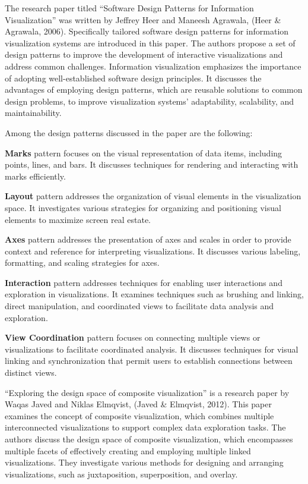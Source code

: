 \documentclass[print]{nuthesis}
\begin{document}
The research paper titled ``Software Design Patterns for Information Visualization'' was written by Jeffrey Heer and Maneesh Agrawala, (Heer \& Agrawala, 2006).
Specifically tailored software design patterns for information visualization systems are introduced in this paper.
The authors propose a set of design patterns to improve the development of interactive visualizations and address common challenges.
Information visualization emphasizes the importance of adopting well-established software design principles.
It discusses the advantages of employing design patterns, which are reusable solutions to common design problems, to improve visualization systems' adaptability, scalability, and maintainability.

Among the design patterns discussed in the paper are the following:

\textbf{Marks} pattern focuses on the visual representation of data items, including points, lines, and bars.
It discusses techniques for rendering and interacting with marks efficiently.

\textbf{Layout} pattern addresses the organization of visual elements in the visualization space.
It investigates various strategies for organizing and positioning visual elements to maximize screen real estate.

\textbf{Axes} pattern addresses the presentation of axes and scales in order to provide context and reference for interpreting visualizations.
It discusses various labeling, formatting, and scaling strategies for axes.

\textbf{Interaction} pattern addresses techniques for enabling user interactions and exploration in visualizations.
It examines techniques such as brushing and linking, direct manipulation, and coordinated views to facilitate data analysis and exploration.

\textbf{View Coordination} pattern focuses on connecting multiple views or visualizations to facilitate coordinated analysis.
It discusses techniques for visual linking and synchronization that permit users to establish connections between distinct views.

``Exploring the design space of composite visualization'' is a research paper by Waqas Javed and Niklas Elmqvist, (Javed \& Elmqvist, 2012).
This paper examines the concept of composite visualization, which combines multiple interconnected visualizations to support complex data exploration tasks.
The authors discuss the design space of composite visualization, which encompasses multiple facets of effectively creating and employing multiple linked visualizations.
They investigate various methods for designing and arranging visualizations, such as juxtaposition, superposition, and overlay.
\end{document}
